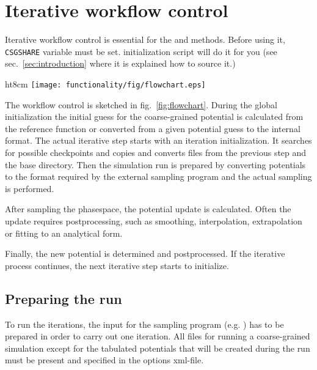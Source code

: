 \chapter{Iterative workflow control}

Iterative workflow control is essential for the \ibi and \imc methods. Before using it, \texttt{CSGSHARE} variable must be set. \votca initialization script will do it for you (see sec.~\ref{sec:introduction} where it is explained how to source it.)

\begin{wrapfigure}{ht}{8cm}  
\texttt{[image: functionality/fig/flowchart.eps]}
  \caption{
    \label{fig:flowchart}
    Block-scheme of the workflow control for the iterative methods. The most time-consuming parts are marked in red.
  }
\end{wrapfigure}

The workflow control is sketched in fig.~\ref{fig:flowchart}. During the global initialization the initial guess for the coarse-grained potential is calculated from the reference function or converted from a given potential guess to the internal format. The actual iterative step starts with an iteration initialization. It searches for possible checkpoints and copies and converts files from the previous step and the base directory. Then the simulation run is prepared by converting potentials to the format required by the external sampling program and the actual sampling is performed. 

After sampling the phasespace, the potential update is calculated. Often the update requires postprocessing, such as smoothing, interpolation, extrapolation or fitting to an analytical form. 

Finally, the new potential is determined and postprocessed. If the iterative process continues, the next iterative step starts to initialize.

\section{Preparing the run}
To run the iterations, the input for the sampling program (e.g. \gromacs ) has to be prepared in order to carry out one iteration. All files for running a coarse-grained simulation except for the tabulated potentials that will be created during the run must be present and specified in the options xml-file.

